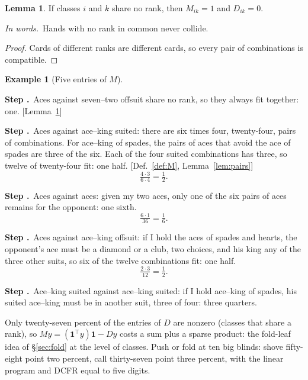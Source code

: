 \documentclass[11pt]{article}
\newcommand{\one}{\mathbf 1}
\theoremstyle{definition}
\newtheorem{example}[definition]{Example}
\newtheorem{lemma}[definition]{Lemma}
\newcommand{\inwords}{\par\smallskip\noindent\textit{In words.}\ }
\newcounter{stp}
\newcommand{\steps}{\setcounter{stp}{0}}
\newcommand{\st}{\stepcounter{stp}\par\medskip\noindent\textbf{Step \arabic{stp}.}\ }
\newcommand{\by}[1]{\hfill{\small\color{blue!50!black}[#1]}}
\newcommand{\Def}[1]{Def.~\ref{#1}}\newcommand{\Lem}[1]{Lemma~\ref{#1}}\newcommand{\Thm}[1]{Thm.~\ref{#1}}
\begin{document}
\begin{lemma}\label{lem:Mone}
If classes $i$ and $k$ share no rank, then $M_{ik}=1$ and $D_{ik}=0$.
\inwords Hands with no rank in common never collide.
\end{lemma}
\begin{proof}
Cards of different ranks are different cards, so every pair of combinations is compatible.
\end{proof}

\begin{example}[Five entries of $M$]\label{ex:M}
\steps
\st Aces against seven--two offsuit share no rank, so they always fit together: one. \by{\Lem{lem:Mone}}
\st Aces against ace--king suited: there are six times four, twenty-four, pairs of combinations. For ace--king of spades, the
pairs of aces that avoid the ace of spades are three of the six. Each of the four suited combinations has three, so twelve of
twenty-four fit: one half. \by{\Def{def:M}, \Lem{lem:pairs}}
\[ \tfrac{4\cdot3}{6\cdot4}=\tfrac12. \]
\st Aces against aces: given my two aces, only one of the six pairs of aces remains for the opponent: one sixth.
\[ \tfrac{6\cdot1}{36}=\tfrac16. \]
\st Aces against ace--king offsuit: if I hold the aces of spades and hearts, the opponent's ace must be a diamond or a club,
two choices, and his king any of the three other suits, so six of the twelve combinations fit: one half.
\[ \tfrac{2\cdot3}{12}=\tfrac12. \]
\st Ace--king suited against ace--king suited: if I hold ace--king of spades, his suited ace--king must be in another suit,
three of four: three quarters.
\end{example}
Only twenty-seven percent of the entries of $D$ are nonzero (classes that share a rank), so $My=(\one^\top y)\one-Dy$ costs a
sum plus a sparse product: the fold-leaf idea of \S\ref{sec:fold} at the level of classes. Push or fold at ten big
blinds: shove fifty-eight point two percent, call thirty-seven point three percent, with the linear program and DCFR equal to
five digits.
\begin{center}\end{center}

\end{document}
